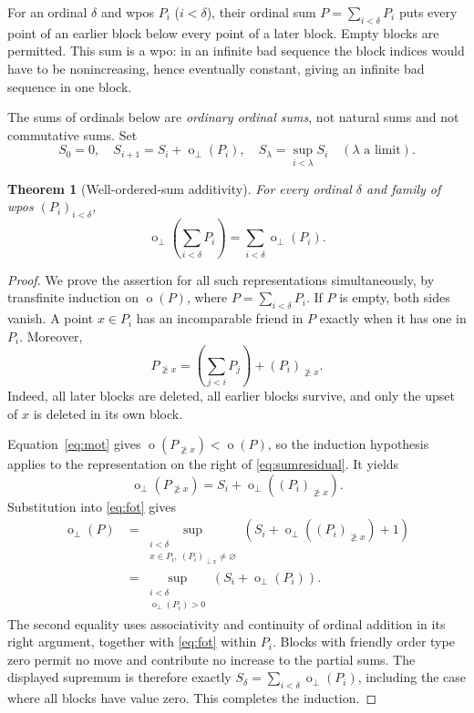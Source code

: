 \documentclass[11pt,a4paper]{article}
\newtheorem{theorem}{Theorem}[section]
\theoremstyle{definition}
\theoremstyle{remark}
\newcommand{\fot}{\operatorname{o}_{\perp}}
\newcommand{\mot}{\operatorname{o}}
\newcommand{\res}[2]{#1_{\not\ge #2}}
\begin{document}
For an ordinal $\delta$ and wpos $P_i$ ($i<\delta$), their ordinal sum
$P=\sum_{i<\delta}P_i$ puts every point of an earlier block below every point
of a later block. Empty blocks are permitted. This sum is a wpo: in an
infinite bad sequence the block indices would have to be nonincreasing,
hence eventually constant, giving an infinite bad sequence in one block.

The sums of ordinals below are \emph{ordinary ordinal sums}, not natural
sums and not commutative sums. Set
\[
 S_0=0,\quad S_{i+1}=S_i+\fot(P_i),\quad
 S_\lambda=\sup_{i<\lambda}S_i\quad(\lambda\text{ a limit}).
\]

\begin{theorem}[Well-ordered-sum additivity]\label{thm:transfinite}
For every ordinal $\delta$ and family of wpos $(P_i)_{i<\delta}$,
\begin{equation}\label{eq:transfinite}
 \boxed{\fot\!\left(\sum_{i<\delta}P_i\right)
          =\sum_{i<\delta}\fot(P_i).}
\end{equation}
\end{theorem}

\begin{proof}
We prove the assertion for all such representations simultaneously, by
transfinite induction on $\mot(P)$, where $P=\sum_{i<\delta}P_i$.
If $P$ is empty, both sides vanish. A point $x\in P_i$ has an incomparable
friend in $P$ exactly when it has one in $P_i$. Moreover,
\begin{equation}\label{eq:sumresidual}
 \res{P}{x}
 =\left(\sum_{j<i}P_j\right)+\res{(P_i)}{x}.
\end{equation}
Indeed, all later blocks are deleted, all earlier blocks survive, and only
the upset of $x$ is deleted in its own block.

Equation~\eqref{eq:mot} gives
$\mot(\res{P}{x})<\mot(P)$, so the induction hypothesis applies to the
representation on the right of \eqref{eq:sumresidual}. It yields
\[
 \fot(\res{P}{x})=S_i+\fot(\res{(P_i)}{x}).
\]
Substitution into \eqref{eq:fot} gives
\begin{align*}
 \fot(P)
 &=\sup_{\substack{i<\delta\\x\in P_i,\ (P_i)_{\perp x}\ne\varnothing}}
     \left(S_i+\fot(\res{(P_i)}{x})+1\right)\\
 &=\sup_{\substack{i<\delta\\\fot(P_i)>0}}
     \left(S_i+\fot(P_i)\right).
\end{align*}
The second equality uses associativity and continuity of ordinal addition
in its right argument, together with \eqref{eq:fot} within $P_i$.
Blocks with friendly order type zero permit no move and contribute no
increase to the partial sums. The displayed supremum is therefore exactly
$S_\delta=\sum_{i<\delta}\fot(P_i)$, including the case where all blocks
have value zero. This completes the induction.
\end{proof}
\end{document}
